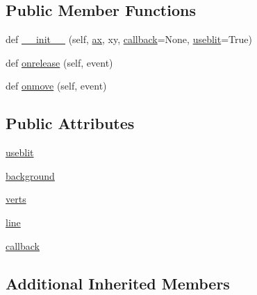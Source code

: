 \subsection*{Public Member Functions}
\begin{DoxyCompactItemize}
\item 
def \hyperlink{classmatplotlib_1_1widgets_1_1Lasso_a1372ded6248404a0bd8b557d721c709e}{\+\_\+\+\_\+init\+\_\+\+\_\+} (self, \hyperlink{classmatplotlib_1_1widgets_1_1AxesWidget_ac0722858b7001d10a42055dc90420b4f}{ax}, xy, \hyperlink{classmatplotlib_1_1widgets_1_1Lasso_a2f36c686c61f23fac32f46ff53f799e3}{callback}=None, \hyperlink{classmatplotlib_1_1widgets_1_1Lasso_aab5d4a819bf45d0b5cc79880c892e9a7}{useblit}=True)
\item 
def \hyperlink{classmatplotlib_1_1widgets_1_1Lasso_ac10ca528009f6d8273fc16770dac96d2}{onrelease} (self, event)
\item 
def \hyperlink{classmatplotlib_1_1widgets_1_1Lasso_a9246d06eb71f545df91a7447d1784113}{onmove} (self, event)
\end{DoxyCompactItemize}
\subsection*{Public Attributes}
\begin{DoxyCompactItemize}
\item 
\hyperlink{classmatplotlib_1_1widgets_1_1Lasso_aab5d4a819bf45d0b5cc79880c892e9a7}{useblit}
\item 
\hyperlink{classmatplotlib_1_1widgets_1_1Lasso_a244a2608f74ee76e61797df5011710f2}{background}
\item 
\hyperlink{classmatplotlib_1_1widgets_1_1Lasso_a3494c78c57cfa6ca47f9b47bca82fe43}{verts}
\item 
\hyperlink{classmatplotlib_1_1widgets_1_1Lasso_a7f872c906ff25706ba9aef42dba2a657}{line}
\item 
\hyperlink{classmatplotlib_1_1widgets_1_1Lasso_a2f36c686c61f23fac32f46ff53f799e3}{callback}
\end{DoxyCompactItemize}
\subsection*{Additional Inherited Members}


